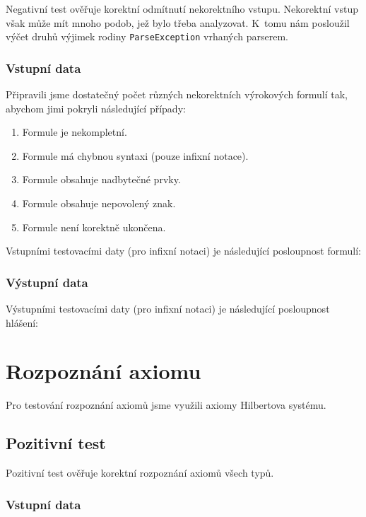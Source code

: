 \documentclass[thesis=B,czech,hidelinks]{thesis}[2012/06/26]
\begin{document}
Negativní test ověřuje korektní odmítnutí nekorektního vstupu. Nekorektní vstup však může mít mnoho podob, jež bylo třeba analyzovat. K~tomu nám posloužil výčet druhů výjimek rodiny \texttt{ParseException} vrhaných parserem.

\subsubsection{Vstupní data}

Připravili jsme dostatečný počet různých nekorektních výrokových formulí tak, abychom jimi pokryli následující případy:

\begin{enumerate}
	\item Formule je nekompletní.
	\item Formule má chybnou syntaxi (pouze infixní notace).
	\item Formule obsahuje nadbytečné prvky.
	\item Formule obsahuje nepovolený znak.
	\item Formule není korektně ukončena.
\end{enumerate}

Vstupními testovacími daty (pro infixní notaci) je následující posloupnost formulí:


\subsubsection{Výstupní data}

Výstupními testovacími daty (pro infixní notaci) je následující posloupnost hlášení:


\section{Rozpoznání axiomu}

Pro testování rozpoznání axiomů jsme využili axiomy Hilbertova systému.

\subsection{Pozitivní test}

Pozitivní test ověřuje korektní rozpoznání axiomů všech typů.

\subsubsection{Vstupní data}
\end{document}
